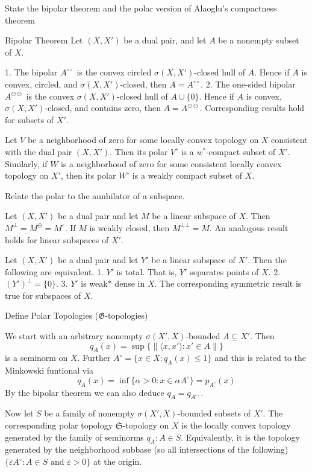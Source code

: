 State the bipolar theorem and the polar version of Alaoglu’s compactness theorem

Bipolar Theorem  
Let \((X, X')\) be a dual pair, and let \(A\) be a nonempty subset of \(X\).

1. The bipolar \(A^{\circ\circ}\) is the convex circled \(\sigma(X, X')\)-closed hull of \(A\). Hence if \(A\) is convex, circled, and \(\sigma(X, X')\)-closed, then \(A = A^{\circ\circ}\).
2. The one-sided bipolar \(A^{\ominus\ominus}\) is the convex \(\sigma(X, X')\)-closed hull of \(A \cup \{0\}\). Hence if \(A\) is convex, \(\sigma(X, X')\)-closed, and contains zero, then \(A = A^{\ominus\ominus}\).
Corresponding results hold for subsets of \(X'\).


Let \( V \) be a neighborhood of zero for some locally convex topology on \( X \) consistent with the dual pair 
\( (X, X') \). Then its polar \( V^\circ \) is a \( w^\ast \)-compact subset of \( X' \).
Similarly, if \( W \) is a neighborhood of zero for some consistent locally convex
topology on \( X' \), then its polar \( W^\circ \) is a weakly compact subset of \( X \).

Relate the polar to the annhilator of a subspace.

Let \( (X, X') \) be a dual pair and let \( M \) be a linear subspace of \( X \).
Then \( M^{\bot} = M^{\ominus} = M^\circ \). If \( M \) is weakly closed, then \( M^{\bot \bot} = M \).
An analogous result holds for linear subspaces of \( X' \).

Let \( (X, X') \) be a dual pair and let
\( Y' \) be a linear subspace of \( X' \). Then the following are equivalent.
1. \( Y' \) is total. That is, \( Y' \) separates points of \( X \).
2. \( (Y')^{\bot} = \{0\} \).
3. \( Y' \) is weak* dense in \( X \).
The corresponding symmetric result is true for subspaces of \( X \).



Define Polar Topologies (\( \mathfrak{G} \)-topologies)

We start with an arbitrary nonempty \( \sigma(X', X) \)-bounded
\( A \subseteq X' \). Then 
\[
    q_A(x) = \sup \{ \|\langle x, x' \rangle : x' \in A \|\}  
\]
is a seminorm on \( X \). Further \( A^\circ = \{x \in X : q_A(x) \leq 1\} \)
and this is related to the Minkowski funtional via
\[
    q_A(x) = \inf \{ \alpha > 0 : x \in \alpha A^\circ \} = p_{A^\circ}(x)
\]
By the bipolar theorem we can also deduce \( q_A = q_{A^{\circ \circ}} \).

Now let \( S \) be a family of nonempty \( \sigma(X', X) \)-bounded subsets of \( X' \). 
The corresponding polar topology \( \mathfrak{S} \)-topology on \( X \) is the locally convex topology 
generated by the family of seminorms \( q_A : A \in S \). 
Equivalently, it is the topology generated by the neighborhood subbase (so all intersections of the following)
\( \{\varepsilon A^\circ : A \in S \text{ and } \varepsilon > 0\} \) 
at the origin.

